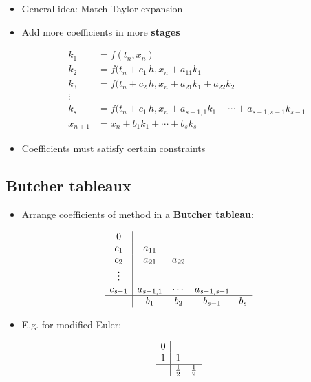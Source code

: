 \documentclass[
]{article}
\providecommand{\tightlist}{%
  \setlength{\itemsep}{0pt}\setlength{\parskip}{0pt}}
\begin{document}
\begin{itemize}
\item
  General idea: Match Taylor expansion
\item
  Add more coefficients in more \textbf{stages}

  \begin{align*}
    k_1 &= f(t_n, x_n) \\
    k_2 &= f(t_n + c_1 \, h, x_n + a_{11} k_1 \\
    k_3 &= f(t_n + c_2 \, h, x_n + a_{21} k_1 + a_{22} k_2 \\
        \vdots \\
    k_s &= f(t_n + c_1 \, h, x_n + a_{s-1,1} k_1 + \cdots + a_{s-1,s-1} k_{s-1} \\
    x_{n+1} &= x_n + b_1 k_1 + \cdots + b_s k_s
    \end{align*}
\item
  Coefficients must satisfy certain constraints
\end{itemize}

\hypertarget{butcher-tableaux}{%
\subsection{Butcher tableaux}\label{butcher-tableaux}}

\begin{itemize}
\tightlist
\item
  Arrange coefficients of method in a \textbf{Butcher tableau}:
\end{itemize}

\[
\begin{array}{c|cccc}
0\\
c_1 & a_{11}\\
c_2 & a_{21} & a_{22} \\
\vdots \\
c_{s-1} & a_{s-1,1} & \cdots & a_{s-1, s-1} \\
\hline
& b_1 & b_2 & b_{s-1} & b_s
\end{array}
\]

\begin{itemize}
\tightlist
\item
  E.g. for modified Euler:
\end{itemize}

\[
\begin{array}{c|cccc}
0\\
1 & 1\\
\hline
& \frac{1}{2} & \frac{1}{2}
\end{array}
\]
\end{document}
